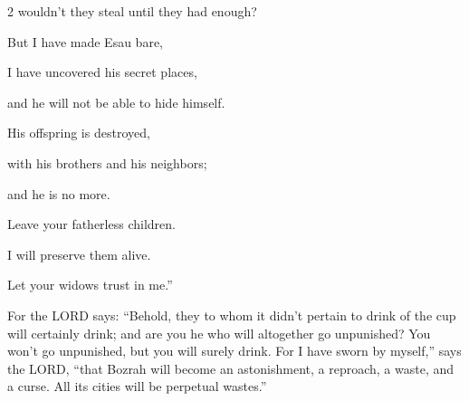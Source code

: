 \begin{multicols}{2}
wouldn’t they steal until they had enough?


\myverse{}But I have made Esau bare,

I have uncovered his secret places,

and he will not be able to hide himself.

His offspring is destroyed,

with his brothers and his neighbors;

and he is no more.


\myverse{}Leave your fatherless children.

I will preserve them alive.

Let your widows trust in me.”

\end{multicols}

\myverse{}For the LORD says: “Behold, they to whom it didn’t pertain to drink of the cup will certainly drink; and are you he who will altogether go unpunished? You won’t go unpunished, but you will surely drink. \myverse{}For I have sworn by myself,” says the LORD, “that Bozrah will become an astonishment, a reproach, a waste, and a curse. All its cities will be perpetual wastes.”

